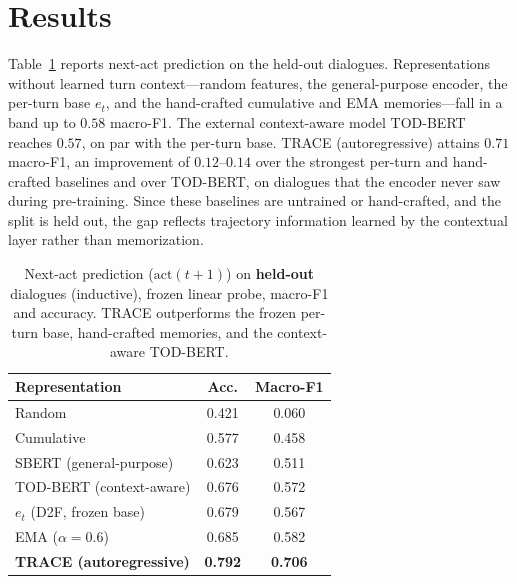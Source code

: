 \documentclass[11pt]{article}
\begin{document}
\section{Results}
\label{sec:results}

Table~\ref{tab:main} reports next-act prediction on the held-out dialogues. Representations without
learned turn context---random features, the general-purpose encoder, the per-turn base $e_t$, and the
hand-crafted cumulative and EMA memories---fall in a band up to $0.58$ macro-F1. The external
context-aware model TOD-BERT reaches $0.57$, on par with the per-turn base. TRACE (autoregressive)
attains $0.71$ macro-F1, an improvement of $0.12$--$0.14$ over the strongest per-turn and
hand-crafted baselines and over TOD-BERT, on dialogues that the encoder never saw during
pre-training. Since these baselines are untrained or hand-crafted, and the split is held out, the gap
reflects trajectory information learned by the contextual layer rather than memorization.

\begin{table}[t]
\centering\small
\begin{tabular}{lcc}
\toprule
Representation & Acc. & Macro-F1 \\
\midrule
Random                         & 0.421 & 0.060 \\
Cumulative                     & 0.577 & 0.458 \\
SBERT (general-purpose)        & 0.623 & 0.511 \\
TOD-BERT (context-aware)       & 0.676 & 0.572 \\
$e_t$ (D2F, frozen base)       & 0.679 & 0.567 \\
EMA ($\alpha{=}0.6$)           & 0.685 & 0.582 \\
\textbf{TRACE (autoregressive)} & \textbf{0.792} & \textbf{0.706} \\
\bottomrule
\end{tabular}
\caption{Next-act prediction ($\mathrm{act}(t{+}1)$) on \textbf{held-out} dialogues (inductive),
frozen linear probe, macro-F1 and accuracy. TRACE outperforms the frozen per-turn base, hand-crafted
memories, and the context-aware TOD-BERT.}
\label{tab:main}
\end{table}
\end{document}
